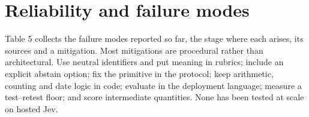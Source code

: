 \section{Reliability and failure modes}\label{sec:reliability-and-failure-modes}

Table 5 collects the failure modes reported so far, the stage where each arises, its sources and a mitigation. Most mitigations are procedural rather than architectural. Use neutral identifiers and put meaning in rubrics; include an explicit abstain option; fix the primitive in the protocol; keep arithmetic, counting and date logic in code; evaluate in the deployment language; measure a test–retest floor; and score intermediate quantities. None has been tested at scale on hosted Jev.

